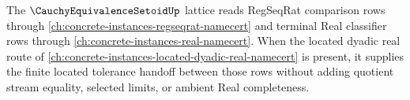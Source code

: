 The $\CauchyEquivalenceSetoidUp$ lattice reads RegSeqRat comparison rows through \autoref{ch:concrete-instances-regseqrat-namecert} and terminal Real classifier rows through \autoref{ch:concrete-instances-real-namecert}. When the located dyadic real route of \autoref{ch:concrete-instances-located-dyadic-real-namecert} is present, it supplies the finite located tolerance handoff between those rows without adding quotient stream equality, selected limits, or ambient Real completeness.
